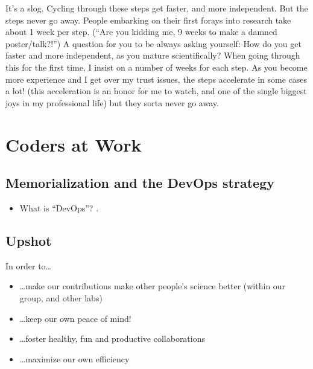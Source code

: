 \documentclass[letterpaper,10pt,english]{sphinxmanual}
\begin{document}
\sphinxAtStartPar
It’s a slog. Cycling through these steps get faster, and more independent. But the steps never go away.
People embarking on their first forays into research take about 1 week per step. (“Are you kidding me, 9 weeks to make a damned poster/talk?!”)
A question for you to be always asking yourself: How do you get faster and more independent, as you mature scientifically?
When going through this for the first time, I insist on a number of weeks for each step.
As you become more experience and I get over my trust issues, the steps accelerate \textendash{}in some cases a lot! (this acceleration is an honor for me to watch, and one of the single biggest joys in my professional life) \textendash{} but they sorta never go away.

\sphinxstepscope


\chapter{Coders at Work}
\label{\detokenize{03CodersAtWork:coders-at-work}}\label{\detokenize{03CodersAtWork:codersatwork}}\label{\detokenize{03CodersAtWork::doc}}

\section{Memorialization and the DevOps strategy}
\label{\detokenize{03CodersAtWork:memorialization-and-the-devops-strategy}}\begin{itemize}
\item {} 
\sphinxAtStartPar
What is “DevOps”? .

\end{itemize}


\section{Upshot}
\label{\detokenize{03CodersAtWork:upshot}}
\sphinxAtStartPar
In order to…
\begin{itemize}
\item {} 
\sphinxAtStartPar
…make our contributions make other people’s science better (within our group, and other labs)

\item {} 
\sphinxAtStartPar
…keep our own peace of mind!

\item {} 
\sphinxAtStartPar
…foster healthy, fun and productive collaborations

\item {} 
\sphinxAtStartPar
…maximize our own efficiency

\end{itemize}
\end{document}
